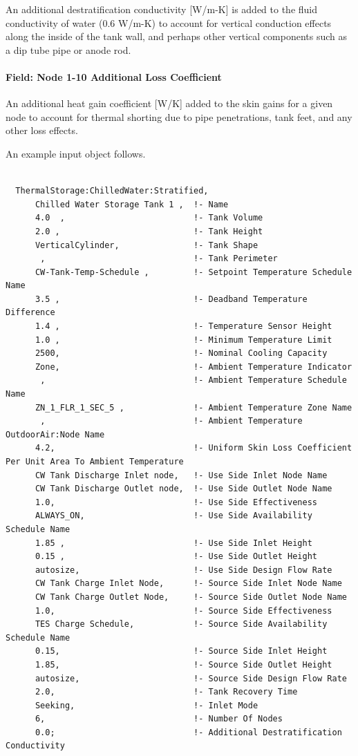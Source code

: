 An additional destratification conductivity {[}W/m-K{]} is added to the fluid conductivity of water (0.6 W/m-K) to account for vertical conduction effects along the inside of the tank wall, and perhaps other vertical components such as a dip tube pipe or anode rod.

\paragraph{Field: Node 1-10 Additional Loss Coefficient}\label{field-node-1-10-additional-loss-coefficient}

An additional heat gain coefficient {[}W/K{]} added to the skin gains for a given node to account for thermal shorting due to pipe penetrations, tank feet, and any other loss effects.

An example input object follows.

\begin{lstlisting}

  ThermalStorage:ChilledWater:Stratified,
      Chilled Water Storage Tank 1 ,  !- Name
      4.0  ,                          !- Tank Volume
      2.0 ,                           !- Tank Height
      VerticalCylinder,               !- Tank Shape
       ,                              !- Tank Perimeter
      CW-Tank-Temp-Schedule ,         !- Setpoint Temperature Schedule Name
      3.5 ,                           !- Deadband Temperature Difference
      1.4 ,                           !- Temperature Sensor Height
      1.0 ,                           !- Minimum Temperature Limit
      2500,                           !- Nominal Cooling Capacity
      Zone,                           !- Ambient Temperature Indicator
       ,                              !- Ambient Temperature Schedule Name
      ZN_1_FLR_1_SEC_5 ,              !- Ambient Temperature Zone Name
       ,                              !- Ambient Temperature OutdoorAir:Node Name
      4.2,                            !- Uniform Skin Loss Coefficient Per Unit Area To Ambient Temperature
      CW Tank Discharge Inlet node,   !- Use Side Inlet Node Name
      CW Tank Discharge Outlet node,  !- Use Side Outlet Node Name
      1.0,                            !- Use Side Effectiveness
      ALWAYS_ON,                      !- Use Side Availability Schedule Name
      1.85 ,                          !- Use Side Inlet Height
      0.15 ,                          !- Use Side Outlet Height
      autosize,                       !- Use Side Design Flow Rate
      CW Tank Charge Inlet Node,      !- Source Side Inlet Node Name
      CW Tank Charge Outlet Node,     !- Source Side Outlet Node Name
      1.0,                            !- Source Side Effectiveness
      TES Charge Schedule,            !- Source Side Availability Schedule Name
      0.15,                           !- Source Side Inlet Height
      1.85,                           !- Source Side Outlet Height
      autosize,                       !- Source Side Design Flow Rate
      2.0,                            !- Tank Recovery Time
      Seeking,                        !- Inlet Mode
      6,                              !- Number Of Nodes
      0.0;                            !- Additional Destratification Conductivity
\end{lstlisting}

